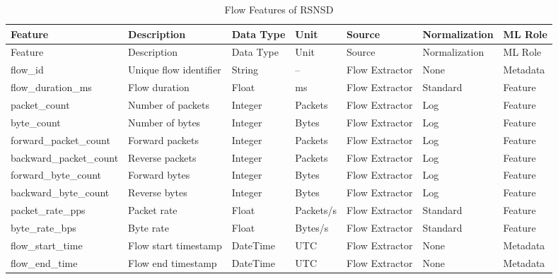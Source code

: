 \documentclass[12pt,a4paper]{article}
\begin{document}
\begin{longtable}{p{3cm}p{5cm}p{2cm}p{1.5cm}p{2.3cm}p{2cm}p{2cm}}
	\caption{Flow Features of RSNSD}
	\label{tab:flow_features}\\
	
	\toprule
	Feature & Description & Data Type & Unit & Source & Normalization & ML Role\\
	\midrule
	\endfirsthead
	
	\toprule
	Feature & Description & Data Type & Unit & Source & Normalization & ML Role\\
	\midrule
	\endhead
	
	flow\_id & Unique flow identifier & String & -- & Flow Extractor & None & Metadata\\
	flow\_duration\_ms & Flow duration & Float & ms & Flow Extractor & Standard & Feature\\
	packet\_count & Number of packets & Integer & Packets & Flow Extractor & Log & Feature\\
	byte\_count & Number of bytes & Integer & Bytes & Flow Extractor & Log & Feature\\
	forward\_packet\_count & Forward packets & Integer & Packets & Flow Extractor & Log & Feature\\
	backward\_packet\_count & Reverse packets & Integer & Packets & Flow Extractor & Log & Feature\\
	forward\_byte\_count & Forward bytes & Integer & Bytes & Flow Extractor & Log & Feature\\
	backward\_byte\_count & Reverse bytes & Integer & Bytes & Flow Extractor & Log & Feature\\
	packet\_rate\_pps & Packet rate & Float & Packets/s & Flow Extractor & Standard & Feature\\
	byte\_rate\_bps & Byte rate & Float & Bytes/s & Flow Extractor & Standard & Feature\\
	flow\_start\_time & Flow start timestamp & DateTime & UTC & Flow Extractor & None & Metadata\\
	flow\_end\_time & Flow end timestamp & DateTime & UTC & Flow Extractor & None & Metadata\\
	
	\bottomrule
\end{longtable}
\end{document}
